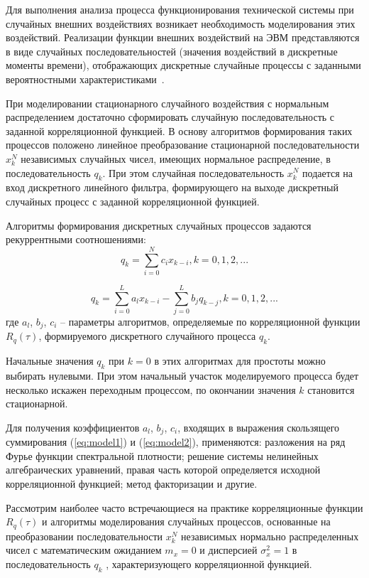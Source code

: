Для выполнения анализа процесса функционирования технической
системы при случайных внешних воздействиях возникает необходимость
моделирования этих воздействий. Реализации функции внешних воздействий на
ЭВМ представляются в виде случайных последовательностей (значения
воздействий в дискретные моменты времени), отображающих дискретные
случайные процессы с заданными вероятностными характеристиками~\cite{modeling:2004}.

При моделировании стационарного случайного воздействия с нормальным
распределением достаточно сформировать случайную последовательность с
заданной корреляционной функцией. В основу алгоритмов формирования таких
процессов положено линейное преобразование стационарной
последовательности ${x}_{k}^{N}$ независимых случайных чисел, имеющих нормальное
распределение, в последовательность ${q}_{k}$. При этом случайная
последовательность ${x}_{k}^{N}$ подается на вход дискретного линейного фильтра,
формирующего на выходе дискретный случайных процесс с заданной
корреляционной функцией.

Алгоритмы формирования дискретных случайных процессов задаются
рекуррентными соотношениями:
\begin{equation} \label{eq:model1}
{q}_{k} = \sum_{i=0}^{N} c_i x_{k-i}, k=0,1,2,...
\end{equation}

\begin{equation} \label{eq:model2}
{q}_{k} = \sum_{i=0}^{L} a_l x_{k-i} - \sum_{j=0}^{L} b_j q_{k-j}, k=0,1,2,...
\end{equation}
где $a_l$, $b_j$, $c_i$ – параметры алгоритмов, определяемые по корреляционной функции ${R}_{q}(\tau)$, формируемого дискретного случайного процесса $q_k$.

Начальные значения $q_k$ при $k = 0$ в этих алгоритмах для простоты можно
выбирать нулевыми. При этом начальный участок моделируемого процесса
будет несколько искажен переходным процессом, по окончании значения $k$
становится стационарной.

Для получения коэффициентов $a_l$, $b_j$, $c_i$, входящих в выражения
скользящего суммирования (\ref{eq:model1}) и (\ref{eq:model2}), применяются: разложения на ряд Фурье
функции спектральной плотности; решение системы нелинейных
алгебраических уравнений, правая часть которой определяется исходной
корреляционной функцией; метод факторизации и другие.

Рассмотрим наиболее часто встречающиеся на практике корреляционные
функции ${R}_{q}(\tau)$ и алгоритмы моделирования случайных процессов, основанные на
преобразовании последовательности ${x}_{k}^{N}$ независимых нормально
распределенных чисел с математическим ожиданием $m_x = 0$ и дисперсией
${\sigma}_{x}^{2} = 1$ в
последовательность $q_k$ , характеризующего корреляционной функцией.


